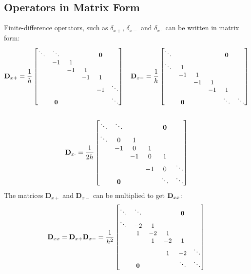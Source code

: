 \subsection{Operators in Matrix Form}
Finite-difference operators, such as $\delta_{x+}$,  $\delta_{x-}$ and $\delta_{x\cdot}$ can be written in matrix form:
\begin{gather*}\small
    \mathbf{D}_{x+} = \frac{1}{h}\begin{bmatrix}
        \ddots &\ddots & & & \mathbf{0}&\\
         & -1 & 1 & & & \\
        & & -1 & 1 & & \\
        & & & -1 & 1 & \\
        & & & & -1 & \ddots\\
        &\mathbf{0} & & & & \ddots \\
    \end{bmatrix}
    \quad
    \mathbf{D}_{x-} = \frac{1}{h}\begin{bmatrix}
        \ddots & & & & \mathbf{0}&\\
        \ddots & 1 & & & & \\
        & -1 & 1 & & & \\
        & & -1 & 1 & & \\
        & & & -1 & 1 & \\
        &\mathbf{0} & & & \ddots & \ddots \\
    \end{bmatrix}\\
    \\
    \mathbf{D}_{x\cdot} = \frac{1}{2h}\begin{bmatrix}\small
        \ddots &\ddots & & & \mathbf{0}&\\
        \ddots & 0 & 1 & & & \\
        & -1 & 0 & 1 & & \\
        & & -1 & 0 & 1 & \\
        & & & -1 & 0 & \ddots \\
        &\mathbf{0} & & & \ddots & \ddots \\
    \end{bmatrix}\\
\end{gather*}
The matrices $\mathbf{D}_{x+}$ and $\mathbf{D}_{x-}$ can be multiplied to get $\mathbf{D}_{xx}$:
\begin{equation}\small
    \mathbf{D}_{xx} = \mathbf{D}_{x+}\mathbf{D}_{x-} = \frac{1}{h^2}\begin{bmatrix}
        \ddots &\ddots & & & \mathbf{0}&\\
        \ddots & -2 & 1 & & & \\
        & 1 & -2 & 1 & & \\
        & & 1 & -2 & 1 & \\
        & & & 1 & -2 & \ddots \\
        &\mathbf{0} & & & \ddots & \ddots \\
    \end{bmatrix}
\end{equation}
